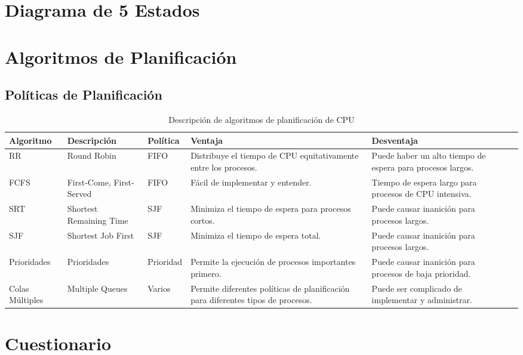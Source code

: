 \documentclass[12pt, a4paper]{article} %
\begin{document}
\section{Diagrama de 5 Estados}

\section{Algoritmos de Planificación}

\subsection{Políticas de Planificación}

\begin{table}[h]
\centering
\begin{tabular}{|l|p{2cm}|p{1.5cm}|p{2cm}|p{3cm}|p{3cm}}
        
\hline
\textbf{Algoritmo} & \textbf{Descripción} & \textbf{Política} & \textbf{Ventaja} & \textbf{Desventaja} \\ \hline
RR & Round Robin & FIFO & Distribuye el tiempo de CPU equitativamente entre los procesos. & Puede haber un alto tiempo de espera para procesos largos. \\ \hline
FCFS & First-Come, First-Served & FIFO & Fácil de implementar y entender. & Tiempo de espera largo para procesos de CPU intensiva. \\ \hline
SRT & Shortest Remaining Time & SJF & Minimiza el tiempo de espera para procesos cortos. & Puede causar inanición para procesos largos. \\ \hline
SJF & Shortest Job First & SJF & Minimiza el tiempo de espera total. & Puede causar inanición para procesos largos. \\ \hline
Prioridades & Prioridades & Prioridad & Permite la ejecución de procesos importantes primero. & Puede causar inanición para procesos de baja prioridad. \\ \hline
Colas Múltiples & Multiple Queues & Varios & Permite diferentes políticas de planificación para diferentes tipos de procesos. & Puede ser complicado de implementar y administrar. \\ \hline
\end{tabular}
\caption{Descripción de algoritmos de planificación de CPU}
\label{tab:algoritmos}
\end{table}

\section{Cuestionario}
\end{document}
